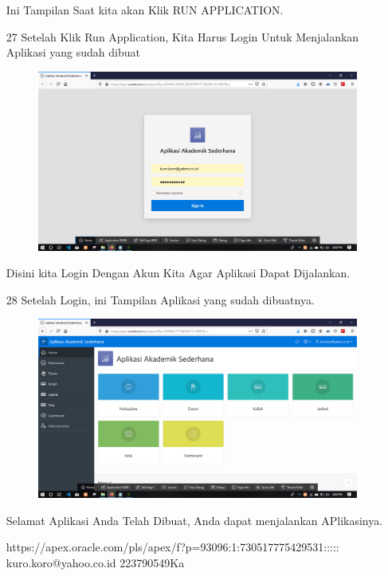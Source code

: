 \begin{enumerate}
\par
Ini Tampilan Saat kita akan Klik RUN APPLICATION.

\newpage
\item[27]Setelah Klik Run Application, Kita Harus Login Untuk Menjalankan Aplikasi yang sudah dibuat

\begin{figure}[!htbp]
    \begin{center}
    \includegraphics[scale=0.2]{figures/49.png}
    \end{center}   
    \end{figure}
    
\par
Disini kita Login Dengan Akun Kita Agar Aplikasi Dapat Dijalankan.

\item[28]Setelah Login, ini Tampilan Aplikasi yang sudah dibuatnya.

\begin{figure}[!htbp]
    \begin{center}
    \includegraphics[scale=0.2]{figures/30.png}
    \end{center}   
    \end{figure}
    
\par
Selamat Aplikasi Anda Telah Dibuat, Anda dapat menjalankan APlikasinya.

https://apex.oracle.com/pls/apex/f?p=93096:1:730517775429531:::::
kuro.koro@yahoo.co.id
223790549Ka
    
\end{enumerate}


